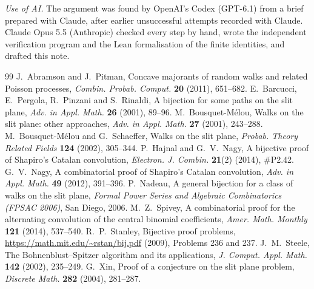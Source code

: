 \documentclass[11pt]{amsart}
\theoremstyle{definition}
\theoremstyle{remark}
\begin{document}
\emph{Use of AI.} The argument was found by OpenAI's Codex (GPT-6.1) from a brief prepared with Claude, after earlier
unsuccessful attempts recorded with Claude. Claude Opus 5.5 (Anthropic) checked every step by hand, wrote the
independent verification program and the Lean formalisation of the finite identities, and drafted this note.

\begin{thebibliography}{99}
 J.~Abramson and J.~Pitman, Concave majorants of random walks and related Poisson processes,
\emph{Combin. Probab. Comput.} \textbf{20} (2011), 651--682.
 E.~Barcucci, E.~Pergola, R.~Pinzani and S.~Rinaldi, A bijection for some paths on the slit plane,
\emph{Adv. in Appl. Math.} \textbf{26} (2001), 89--96.
 M.~Bousquet-M\'elou, Walks on the slit plane: other approaches, \emph{Adv. in Appl. Math.} \textbf{27}
(2001), 243--288.
 M.~Bousquet-M\'elou and G.~Schaeffer, Walks on the slit plane, \emph{Probab. Theory Related Fields}
\textbf{124} (2002), 305--344.
 P.~Hajnal and G.~V.~Nagy, A bijective proof of Shapiro's Catalan convolution, \emph{Electron. J. Combin.}
\textbf{21}(2) (2014), \#P2.42.
 G.~V.~Nagy, A combinatorial proof of Shapiro's Catalan convolution, \emph{Adv. in Appl. Math.} \textbf{49}
(2012), 391--396.
 P.~Nadeau, A general bijection for a class of walks on the slit plane, \emph{Formal Power Series
and Algebraic Combinatorics (FPSAC 2006)}, San Diego, 2006.
 M.~Z.~Spivey, A combinatorial proof for the alternating convolution of the central binomial
coefficients, \emph{Amer. Math. Monthly} \textbf{121} (2014), 537--540.
 R.~P.~Stanley, Bijective proof problems, \url{https://math.mit.edu/~rstan/bij.pdf} (2009), Problems 236
and 237.
 J.~M.~Steele, The Bohnenblust--Spitzer algorithm and its applications, \emph{J. Comput. Appl. Math.}
\textbf{142} (2002), 235--249.
 G.~Xin, Proof of a conjecture on the slit plane problem, \emph{Discrete Math.} \textbf{282} (2004),
281--287.
\end{thebibliography}
\end{document}
